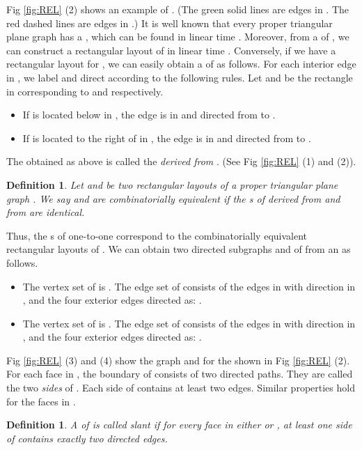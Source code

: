 \documentclass[11pt]{article}
\newtheorem{definition}[figure]{Definition}
\begin{document}
Fig \ref{fig:REL} (2) shows an example of . (The green solid
lines are edges in . The red dashed lines are edges in .)
It is well known that every proper triangular plane graph  has a
, which can be found in linear time \cite{He93,KH97}. Moreover,
from a  of , we can construct a rectangular layout 
of  in linear time \cite{He93,KH97}. Conversely, if we have a
rectangular layout  for , we can easily obtain a  
of  as follows. For each interior edge  in , we label
and direct  according to the following rules.  Let  and 
be the rectangle in  corresponding to  and  respectively.

\begin{itemize}
\item  If  is located below  in , the edge 
is in  and directed from  to .
\item   If  is located to the right of  in ,
the edge  is in  and directed from  to .
\end{itemize}

The   obtained as above is called the {\em  derived from }.
(See Fig \ref{fig:REL} (1) and (2)).

\begin{definition}
Let  and  be two rectangular layouts of a proper triangular
plane graph . We say  and  are {\rm combinatorially
equivalent} if the s of  derived from  and
from   are identical.
\end{definition}

Thus, the s of  one-to-one correspond to
the combinatorially equivalent rectangular layouts of .
We can obtain two directed subgraphs  and  of  from
an   as follows.

\begin{itemize}
\item The vertex set of  is . The edge set of  consists of
the edges in  with direction in , and the four exterior edges
directed as: .
\item The vertex set of  is . The edge set of  consists of
the edges in  with direction in , and the four exterior edges
directed as: .
\end{itemize}

Fig \ref{fig:REL} (3) and (4) show the graph  and 
for the  shown in Fig \ref{fig:REL} (2).
For each face  in , the boundary of  consists of two
directed paths. They are called the two {\em sides} of .
Each side of  contains at least two edges. Similar properties
hold for the faces in  \cite{Fu06,Fu09,He93,KH97}.

\begin{definition}
A   of  is called {\em slant}
if for every face  in either  or , at least one
side of  contains exactly two directed edges.
\end{definition}
\end{document}
